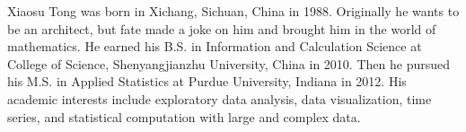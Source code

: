 %
%
%
%

\begin{vita}

Xiaosu Tong was born in Xichang, Sichuan, China in 1988. Originally he wants to 
be an architect, but fate made a joke on him and brought him in the world of 
mathematics. He earned his B.S. in 
Information and Calculation Science at College of Science, Shenyangjianzhu 
University, China in 2010. Then he pursued his M.S. in Applied Statistics at Purdue
University, Indiana in 2012. His academic interests include exploratory data 
analysis, data visualization, time series, and statistical computation with
large and complex data.

\end{vita}
